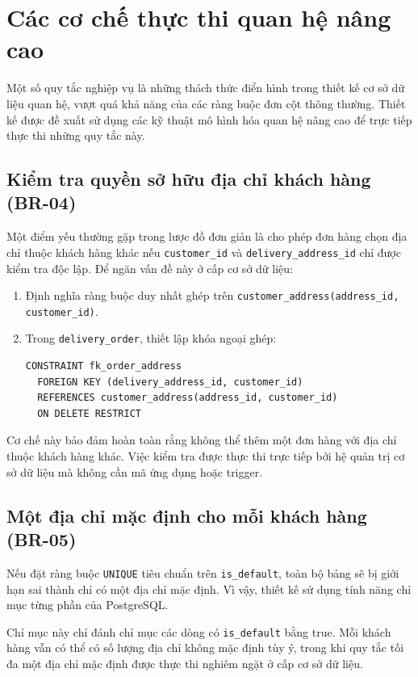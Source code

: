 \section{Các cơ chế thực thi quan hệ nâng cao}\label{s:advancedenforcement}

Một số quy tắc nghiệp vụ là những thách thức điển hình trong thiết kế cơ sở dữ liệu quan hệ, vượt quá khả năng của các ràng buộc đơn cột thông thường. Thiết kế được đề xuất sử dụng các kỹ thuật mô hình hóa quan hệ nâng cao để trực tiếp thực thi những quy tắc này.

\subsection{Kiểm tra quyền sở hữu địa chỉ khách hàng (BR-04)}
Một điểm yếu thường gặp trong lược đồ đơn giản là cho phép đơn hàng chọn địa chỉ thuộc khách hàng khác nếu \texttt{customer\_id} và \texttt{delivery\_address\_id} chỉ được kiểm tra độc lập. Để ngăn vấn đề này ở cấp cơ sở dữ liệu:
\begin{enumerate}
    \item Định nghĩa ràng buộc duy nhất ghép trên \texttt{customer\_address(address\_id, customer\_id)}.
    \item Trong \texttt{delivery\_order}, thiết lập khóa ngoại ghép:
\begin{verbatim}
CONSTRAINT fk_order_address
  FOREIGN KEY (delivery_address_id, customer_id)
  REFERENCES customer_address(address_id, customer_id)
  ON DELETE RESTRICT
\end{verbatim}
\end{enumerate}
Cơ chế này bảo đảm hoàn toàn rằng không thể thêm một đơn hàng với địa chỉ thuộc khách hàng khác. Việc kiểm tra được thực thi trực tiếp bởi hệ quản trị cơ sở dữ liệu mà không cần mã ứng dụng hoặc trigger.

\subsection{Một địa chỉ mặc định cho mỗi khách hàng (BR-05)}
Nếu đặt ràng buộc \texttt{UNIQUE} tiêu chuẩn trên \texttt{is\_default}, toàn bộ bảng sẽ bị giới hạn sai thành chỉ có một địa chỉ mặc định. Vì vậy, thiết kế sử dụng tính năng chỉ mục từng phần của PostgreSQL.

Chỉ mục này chỉ đánh chỉ mục các dòng có \texttt{is\_default} bằng true. Mỗi khách hàng vẫn có thể có số lượng địa chỉ không mặc định tùy ý, trong khi quy tắc tối đa một địa chỉ mặc định được thực thi nghiêm ngặt ở cấp cơ sở dữ liệu.

